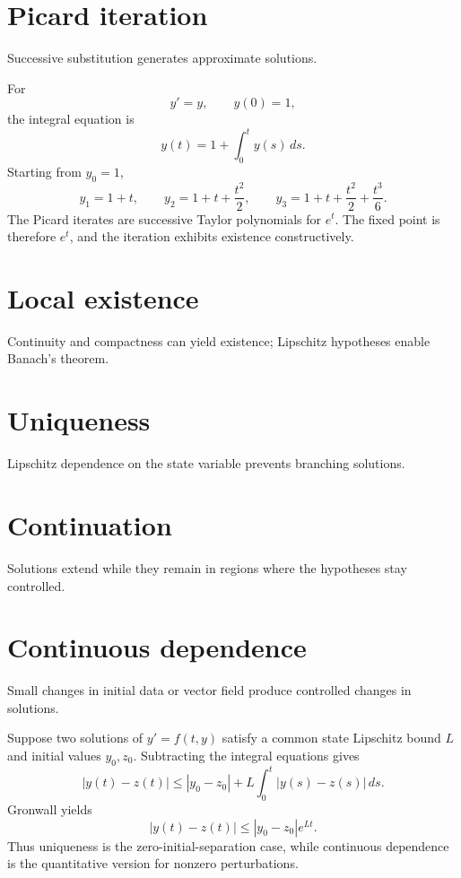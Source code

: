 \section{Picard iteration}
Successive substitution generates approximate solutions.


\begin{example}\label{ex:ii19-expand-01}
For
\[
y'=y,\qquad y(0)=1,
\]
the integral equation is
\[
y(t)=1+\int_0^t y(s)\,ds.
\]
Starting from \(y_0=1\),
\[
y_1=1+t,\qquad
y_2=1+t+\frac{t^2}{2},\qquad
y_3=1+t+\frac{t^2}{2}+\frac{t^3}{6}.
\]
The Picard iterates are successive Taylor polynomials for \(e^t\). The fixed
point is therefore \(e^t\), and the iteration exhibits existence constructively.
\end{example}
\section{Local existence}
Continuity and compactness can yield existence; Lipschitz hypotheses enable Banach's theorem.

\section{Uniqueness}
Lipschitz dependence on the state variable prevents branching solutions.

\section{Continuation}
Solutions extend while they remain in regions where the hypotheses stay controlled.

\section{Continuous dependence}
Small changes in initial data or vector field produce controlled changes in solutions.


\begin{example}\label{ex:ii19-expand-02}
Suppose two solutions of \(y'=f(t,y)\) satisfy a common state Lipschitz bound
\(L\) and initial values \(y_0,z_0\). Subtracting the integral equations gives
\[
|y(t)-z(t)|
\le |y_0-z_0|+L\int_0^t|y(s)-z(s)|\,ds.
\]
Gronwall yields
\[
|y(t)-z(t)|\le |y_0-z_0|e^{Lt}.
\]
Thus uniqueness is the zero-initial-separation case, while continuous
dependence is the quantitative version for nonzero perturbations.
\end{example}
